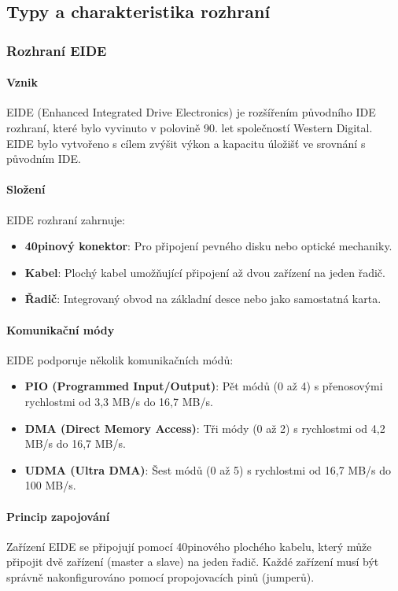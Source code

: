 \subsection{Typy a charakteristika rozhraní}

\subsubsection{Rozhraní EIDE}

\paragraph{Vznik}
EIDE (Enhanced Integrated Drive Electronics) je rozšířením původního IDE rozhraní, které bylo vyvinuto v polovině 90. let společností Western Digital. EIDE bylo vytvořeno s cílem zvýšit výkon a kapacitu úložišť ve srovnání s původním IDE.

\paragraph{Složení}
EIDE rozhraní zahrnuje:
\begin{itemize}
\item \textbf{40pinový konektor}: Pro připojení pevného disku nebo optické mechaniky.
\item \textbf{Kabel}: Plochý kabel umožňující připojení až dvou zařízení na jeden řadič.
\item \textbf{Řadič}: Integrovaný obvod na základní desce nebo jako samostatná karta.
\end{itemize}

\paragraph{Komunikační módy}
EIDE podporuje několik komunikačních módů:
\begin{itemize}
\item \textbf{PIO (Programmed Input/Output)}: Pět módů (0 až 4) s přenosovými rychlostmi od 3,3 MB/s do 16,7 MB/s.
\item \textbf{DMA (Direct Memory Access)}: Tři módy (0 až 2) s rychlostmi od 4,2 MB/s do 16,7 MB/s.
\item \textbf{UDMA (Ultra DMA)}: Šest módů (0 až 5) s rychlostmi od 16,7 MB/s do 100 MB/s.
\end{itemize}

\paragraph{Princip zapojování}
Zařízení EIDE se připojují pomocí 40pinového plochého kabelu, který může připojit dvě zařízení (master a slave) na jeden řadič. Každé zařízení musí být správně nakonfigurováno pomocí propojovacích pinů (jumperů).

